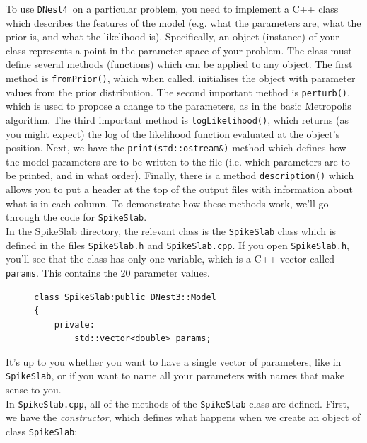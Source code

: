 \documentclass[a4paper, 11pt]{article}
\newcommand{\dnest}{{\tt DNest4}}
\begin{document}
To use \dnest~on a particular problem, you need to implement a C++ class
which describes the features of the model (e.g. what the parameters are,
what the prior is, and what the likelihood is). Specifically, an object
(instance) of your class represents a point in the parameter space of your
problem. The class must define several methods (functions) which can be
applied to any object. The first method is {\tt fromPrior()}, which when called,
initialises the object with parameter values from the prior distribution.
The second important method is {\tt perturb()}, which is used to propose
a change to the parameters, as in the basic Metropolis algorithm. The third
important method is {\tt logLikelihood()}, which returns (as you might expect)
the log of the likelihood function evaluated at the object's position. Next,
we have the {\tt print(std::ostream\&)} method which defines how the model
parameters are to be written to the file (i.e. which parameters are to be
printed, and in what order). Finally, there is a method {\tt description()}
which allows you to put a header at the top of the output files with information
about what is in each column. To demonstrate how these methods work, we'll go
through the code for {\tt SpikeSlab}.\\

In the SpikeSlab directory,
the relevant class is the {\tt SpikeSlab} class which is defined in the files
{\tt SpikeSlab.h} and {\tt SpikeSlab.cpp}. If you open {\tt SpikeSlab.h},
you'll see that the class has only one variable, which is a C++ vector called
{\tt params}. This contains the 20 parameter values.\\

\begin{figure}
\begin{framed}
\begin{verbatim}
class SpikeSlab:public DNest3::Model
{
    private:
        std::vector<double> params;
\end{verbatim}
\end{framed}
\end{figure}

It's up to you whether you want to have a single vector of parameters, like
in {\tt SpikeSlab}, or if you want to name all your parameters with names that
make sense to you.\\

In {\tt SpikeSlab.cpp}, all of the methods of the {\tt SpikeSlab} class
are defined. First, we have the {\it constructor}, which defines what happens
when we create an object of class {\tt SpikeSlab}:\\
\end{document}

